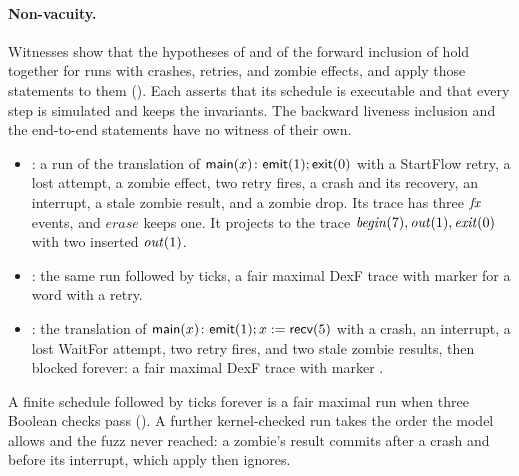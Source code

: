 \paragraph{Non-vacuity.}
Witnesses show that the hypotheses of 
and of the forward inclusion of  hold together for
runs with crashes, retries, and zombie effects, and apply those statements
to them (). Each asserts
that its schedule is executable and that every step is simulated and keeps
the invariants. The backward liveness inclusion and the end-to-end
statements have no witness of their own.
\begin{itemize}
\item {}: a run of the translation of
  $\textsf{main}(x)\colon \textsf{emit}(1); \textsf{exit}(0)$ with a StartFlow retry,
  a lost attempt, a zombie effect, two retry fires, a crash and its
  recovery, an interrupt, a stale zombie result, and a zombie drop. Its
  trace has three $\mathit{fx}$ events, and $\mathit{erase}$ keeps one. It
  projects to the \Lang{} trace $\mathit{begin}(7), \mathit{out}(1),
  \mathit{exit}(0)$ with two inserted $\mathit{out}(1)$.
\item {}: the same run
  followed by ticks, a fair maximal DexF trace with marker \mterm{} for a
  word with a retry.
\item {}: the translation of
  $\textsf{main}(x)\colon \textsf{emit}(1); x := \textsf{recv}(5)$ with a crash, an
  interrupt, a lost WaitFor attempt, two retry fires, and two stale zombie
  results, then blocked forever: a fair maximal DexF trace with marker
  \mdead{}.
\end{itemize}
A finite schedule followed by ticks forever is a fair maximal run when
three Boolean checks pass ().
A further kernel-checked run takes the order the model allows and the fuzz
never reached: a zombie's result commits after a crash and before its
interrupt, which apply then ignores.

